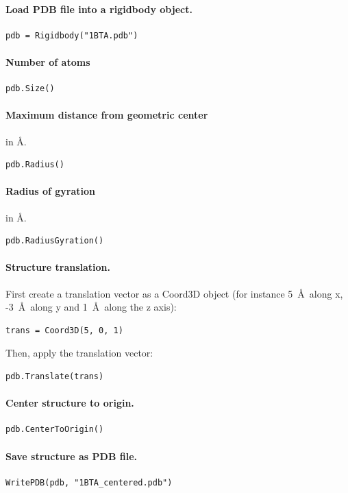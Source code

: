 \documentclass[12pt,a4paper]{article}
\begin{document}
\paragraph{Load PDB file into a rigidbody object.}
\begin{verbatim}
pdb = Rigidbody("1BTA.pdb")
\end{verbatim}


\paragraph{Number of atoms}
\begin{verbatim}
pdb.Size()
\end{verbatim}


\paragraph{Maximum distance from geometric center} in \AA.
\begin{verbatim}
pdb.Radius()
\end{verbatim}


\paragraph{Radius of gyration} in \AA.
\begin{verbatim}
pdb.RadiusGyration()
\end{verbatim}


\paragraph{Structure translation.}
First create a translation vector as a Coord3D object (for instance 5~\AA\ along x, 
-3~\AA\ along y and 1~\AA\ along the z axis):
\begin{verbatim}
trans = Coord3D(5, 0, 1)
\end{verbatim}
Then, apply the translation vector:
\begin{verbatim}
pdb.Translate(trans)
\end{verbatim}


\paragraph{Center structure to origin.}
\begin{verbatim}
pdb.CenterToOrigin()
\end{verbatim}


\paragraph{Save structure as PDB file.}
\begin{verbatim}
WritePDB(pdb, "1BTA_centered.pdb")
\end{verbatim}
\end{document}
